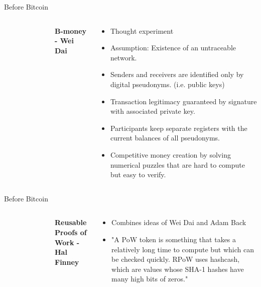 \documentclass[]{beamer}
\begin{document}
\begin{frame}{Before Bitcoin}
\begin{columns}
\begin{figure}
	\begin{tikzpicture}[scale=1]
			
	\end{tikzpicture}
\end{figure}
	\textbf{B-money - Wei Dai} \\
	\vspace{0.5em}
	\begin{small}
	\begin{itemize}
		\item Thought experiment
		\item Assumption: Existence of an untraceable network.
		\item Senders and receivers are identified only by digital pseudonyms. (i.e. public keys) 
		\item Transaction legitimacy guaranteed by signature with associated private key.
		\item Participants keep separate registers with the current balances of all pseudonyms.
		\item Competitive money creation by solving numerical puzzles that are hard to compute but easy to verify.
	\end{itemize}
	\end{small}
\end{columns}
\end{frame}


\begin{frame}{Before Bitcoin}
\begin{columns}
\begin{figure}
	\begin{tikzpicture}[scale=1]
			
	\end{tikzpicture}
\end{figure}
	\textbf{Reusable Proofs of Work - Hal Finney}
	\vspace{0.5em}
	\begin{small}
	\begin{itemize}
		\item Combines ideas of Wei Dai and Adam Back
		\item "A PoW token is something that takes a relatively long time to compute but which can be checked quickly. RPoW uses hashcash, which are values whose SHA-1 hashes have many high bits of zeros." 
	\end{itemize}
	\end{small}
\end{columns}
\end{frame}
\end{document}
